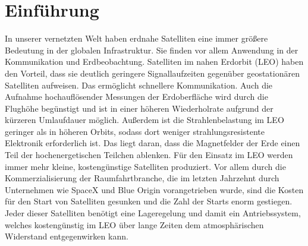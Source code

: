\chapter{Einführung}
In unserer vernetzten Welt haben erdnahe Satelliten eine immer größere Bedeutung in der globalen Infrastruktur. Sie finden vor allem Anwendung in der Kommunikation und Erdbeobachtung. Satelliten im nahen Erdorbit (LEO) haben den Vorteil, dass sie deutlich geringere Signallaufzeiten gegenüber geostationären Satelliten aufweisen. Das ermöglicht schnellere Kommunikation. Auch die Aufnahme hochauflösender Messungen der Erdoberfläche wird durch die Flughöhe begünstigt und ist in einer höheren Wiederholrate aufgrund der kürzeren Umlaufdauer möglich. Außerdem ist die Strahlenbelastung im LEO geringer als in höheren Orbits, sodass dort weniger strahlungsresistente Elektronik erforderlich ist. Das liegt daran, dass die Magnetfelder der Erde einen Teil der hochenergetischen Teilchen ablenken. Für den Einsatz im LEO werden immer mehr kleine, kostengünstige Satelliten produziert. Vor allem durch die Kommerzialisierung der Raumfahrtbranche, die im letzten Jahrzehnt durch Unternehmen wie SpaceX und Blue Origin vorangetrieben wurde, sind die Kosten für den Start von Satelliten gesunken und die Zahl der Starts enorm gestiegen. Jeder dieser Satelliten benötigt eine Lageregelung und damit ein Antriebssystem, welches kostengünstig im LEO über lange Zeiten dem atmosphärischen Widerstand entgegenwirken kann.

